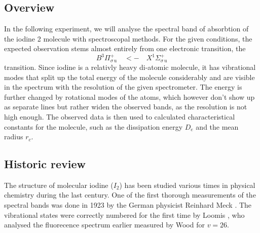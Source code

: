\subsection{Overview}
In the following experiment, we will analyse the spectral band of absorbtion of the iodine 2 molecule 
with spectroscopal methods. For the given conditions, the expected observation stems almost 
entirely from one electronic transition, the 
\begin{equation}
    B ^3\Pi_{\sigma \, \mathrm{u}}^{+} \quad <- \quad X ^1\Sigma_{\sigma \, \mathrm{u}}^{+}
\end{equation}
transition. Since iodine is a relativly heavy di-atomic molecule, it has vibrational modes that 
split up the total energy of the molecule considerably and are visible in the spectrum with the 
resolution of the given spectrometer. The energy is further changed by rotational modes of the 
atoms, which however don't show up as separate lines but rather widen the observed bands, as the 
resolution is not high enough. 
The observed data is then used to calculated characteristical constants for the molecule, such as 
the dissipation energy $D_e$ and the mean radius $r_c$. 

\subsection{Historic review}
The structure of molecular iodine ($I_2$) has been studied various times in physical chemistry 
during the last century. One of the first thorough measurements of the spectral bands was done in 
1923 by the German physicist Reinhard Meck \cite{mecke1923bandenspektrum}. The vibrational states 
were correctly numbered for the first time by Loomis \cite{loomis1927correlation}, who analysed 
the fluorecence spectrum earlier measured by Wood \cite{wood1911} for $v = 26$.


